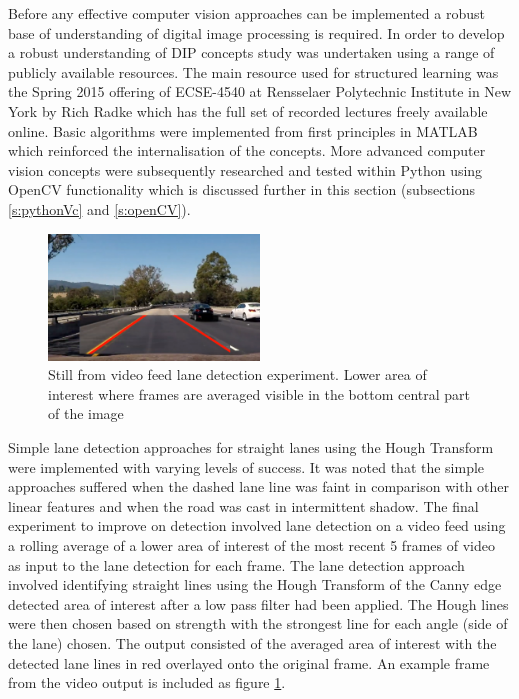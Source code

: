 \documentclass[]{aiaa-tc}%
\begin{document}
Before any effective computer vision approaches can be implemented a robust base of understanding of digital image processing is required. In order to develop a robust understanding of DIP concepts study was undertaken using a range of publicly available resources. The main resource used for structured learning was the Spring 2015 offering of ECSE-4540 at Rensselaer Polytechnic Institute in New York by Rich Radke which has the full set of recorded lectures freely available online. Basic algorithms were implemented from first principles in MATLAB which reinforced the internalisation of the concepts. More advanced computer vision concepts were subsequently researched and tested within Python using OpenCV functionality which is discussed further in this section (subsections \ref{s:pythonVc} and \ref{s:openCV}). 

\begin{figure} %
	\centering
	\includegraphics[width=0.5\textwidth, height=0.5\textwidth]{early_lane_detection_experiment.png}
	\caption{Still from video feed lane detection experiment. Lower area of interest where frames are averaged visible in the bottom central part of the image}
	\label{f:simpleLaneDetectionHough}
\end{figure}

Simple lane detection approaches for straight lanes using the Hough Transform were implemented with varying levels of success. It was noted that the simple approaches suffered when the dashed lane line was faint in comparison with other linear features and when the road was cast in intermittent shadow. The final experiment to improve on detection involved lane detection on a video feed using a rolling average of a lower area of interest of the most recent 5 frames of video as input to the lane detection for each frame. The lane detection approach involved identifying straight lines using the Hough Transform of the Canny edge detected area of interest after a low pass filter had been applied. The Hough lines were then chosen based on strength with the strongest line for each angle (side of the lane) chosen. The output consisted of the averaged area of interest with the detected lane lines in red overlayed onto the original frame. An example frame from the video output is included as figure \ref{f:simpleLaneDetectionHough}.
\end{document}
